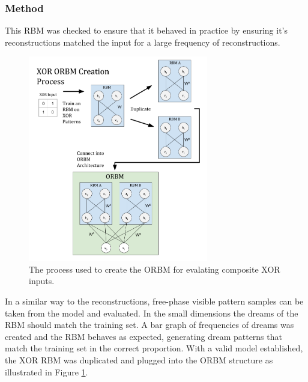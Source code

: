 \subsubsection{Method}

This RBM was checked to ensure that it behaved in practice by ensuring it's reconstructions matched the input for a large frequency of reconstructions.
\begin{figure}[htb]
  \begin{center}
    \includegraphics[width=0.7\textwidth]{Assets/XOR-ORBM-Creation-Process.png}
  \end{center}
  \caption{The process used to create the ORBM for evalating composite XOR inputs.}
  \label{F:XOR-ORBM-Creation-Process-Diagram}
\end{figure}
In a similar way to the reconstructions, free-phase visible pattern samples can be taken from the model and evaluated. In the small dimensions the dreams of the RBM should match the training set. A bar graph of frequencies of dreams was created and the RBM behaves as expected, generating dream patterns that match the training set in the correct proportion. With a valid model established, the XOR RBM was duplicated and plugged into the ORBM structure as illustrated in Figure \ref{F:XOR-ORBM-Creation-Process-Diagram}.


